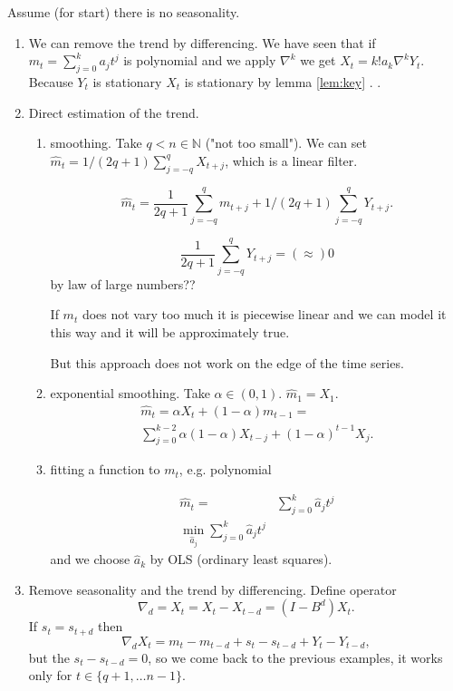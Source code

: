 \documentclass[12pt,a4paper, notitlepage]{book}
\theoremstyle{definition} %
\theoremstyle{plain} %
\newcommand{\N}{\mathbb N}
\begin{document}
Assume (for start) there is no seasonality. 
\begin{enumerate}
\item We can remove the trend by differencing. We have seen that if $m_t = \sum_{j=0}^ka_j t^j$ is polynomial and we apply $\nabla^k$ we get
$X_t = k! a_k \nabla^k Y_t$. Because $Y_t$ is stationary $X_t$ is stationary by lemma
\ref{lem:key} .
.
\item Direct estimation of the trend. 
\begin{enumerate}
\item smoothing. Take $q < n \in \N$ ("not too small"). We can set $\hat{m}_t = 1 / (2q + 1)\sum_{j = -q}^q X_{t+j}$, which is a linear filter. 

\[ \hat{m}_t = \frac{1}{2q + 1}\sum_{j = -q}^q m_{t+j}+ 1 / (2q + 1)\sum_{j = -q}^q Y_{t+j}. \]

\[ \frac{1 }{ 2q + 1}\sum_{j = -q}^q Y_{t+j} = (\approx) 0 \]  by law of large numbers??

If $m_t$ does not vary too much it is piecewise linear and we can model it this way and it will be approximately true.

But this approach does not work on the edge of the time series. 

\item exponential smoothing. Take $\alpha \in (0,1)$. $\hat{m}_1 = X_1$. 
\begin{align*}  \hat{m}_t = \alpha X_t + (1 - \alpha) m_{t-1} = \\
\sum_{j = 0}^{k-2} \alpha(1-\alpha) X_{t-j} + (1-\alpha)^{t-1} X_j.
\end{align*}


\item fitting a function to $m_t$, e.g. polynomial

\begin{align*}  \hat{m}_t  = & \sum_{j = 0}^k \hat{a}_jt^j   \\
 \min _{ \hat{a}_j } \sum _{j=0} ^k \hat{a} _j t^j \end{align*}
and we choose $\hat{a}_k $ by OLS (ordinary least squares).

\end{enumerate}
 \item Remove seasonality and the trend by differencing. Define operator 
\[ \nabla_d = X_t = X_t - X_{t -d} = (I - B^d)X_t. \]
If $s_t = s_{t+d}$ then 
\[ \nabla_d X_t = m_t - m_{t-d} + s_t - s_{t-d} + Y_t - Y_{t-d}, \]
 but the $ s_t - s_{t-d} = 0$, so we come back to the previous examples, it works only for $ t \in \{q +1, \ldots n-1 \} $.


\end{enumerate}
\end{document}
